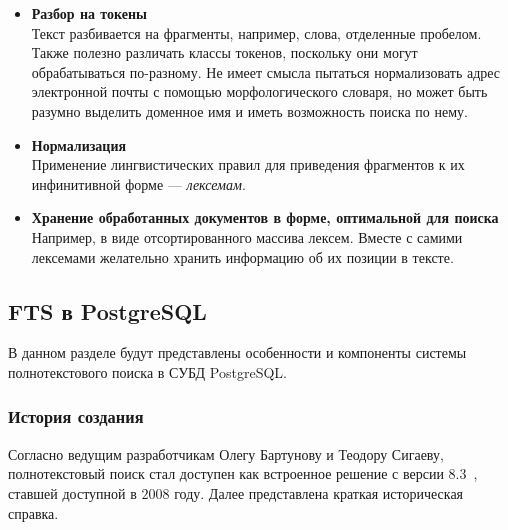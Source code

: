 \begin{itemize}
    \item{\textbf{Разбор на токены}} \\
          Текст разбивается на фрагменты, например, слова, отделенные пробелом. Также полезно различать классы токенов, поскольку они могут обрабатываться по-разному.
          Не имеет смысла пытаться нормализовать адрес электронной почты с помощью морфологического словаря, но может быть разумно выделить доменное имя и иметь возможность поиска по нему.
    \item{\textbf{Нормализация}} \\
          Применение лингвистических правил для приведения фрагментов к их инфинитивной форме --- \textit{лексемам}.
    \item{\textbf{Хранение обработанных документов в форме, оптимальной для поиска}} \\
          Например, в виде отсортированного массива лексем.
          Вместе с самими лексемами желательно хранить информацию об их позиции в тексте.
\end{itemize}

\subsection{FTS в PostgreSQL}

В данном разделе будут представлены особенности и компоненты системы полнотекстового поиска в СУБД PostgreSQL.

\subsubsection{История создания}
Согласно ведущим разработчикам Олегу Бартунову и Теодору Сигаеву, полнотекстовый поиск стал доступен как встроенное решение с версии 8.3~\cite{bartunov2001full}, ставшей доступной в $2008$ году.
Далее представлена краткая историческая справка.

